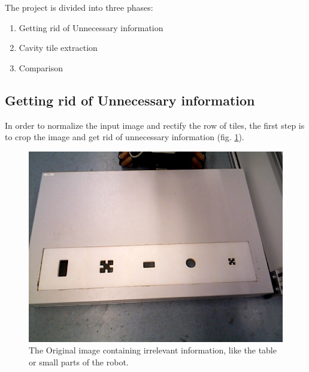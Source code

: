 \documentclass{article}
\begin{document}
The project is divided into three phases: 
\begin{enumerate}
\item Getting rid of Unnecessary information
\item Cavity tile extraction
\item Comparison
\end{enumerate}

\subsection{Getting rid of Unnecessary information}
In order to normalize the input image and rectify the row of tiles, the first step is to crop the image and get rid of unnecessary information (fig. \ref{fig:original}). \\
\begin{figure}[h!]
\centering
\includegraphics[scale=0.3]{images/frame01.jpg}
\caption{The Original image containing irrelevant information, like the table or small parts of the robot.}
\label{fig:original}
\end{figure}
\end{document}
